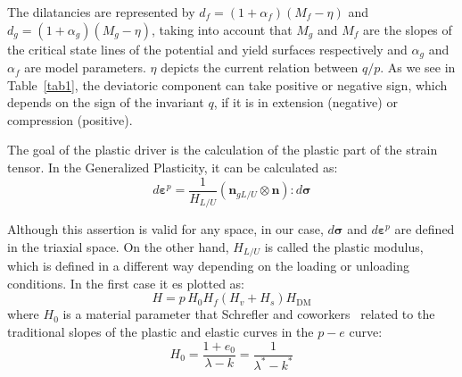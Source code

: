 \documentclass[preprint,12pt,a4paper]{elsarticle}
\begin{document}
The dilatancies are represented by $d_{f}=\left(1+\alpha_{f}\right)\left(M_{f}-\eta\right)$ and $d_{g}=\left(1+\alpha_{g}\right)\left(M_{g}-\eta\right)$, taking into account that $M_{g}$ and $M_{f}$ are the slopes of the critical state lines of the potential and yield surfaces respectively and $\alpha_{g}$ and $\alpha_{f}$ are model parameters. $\eta$ depicts the current relation between $q/p$. As we see in Table~\ref{tab1}, the deviatoric component can take positive or negative sign, which depends on the sign of the invariant $q$, if it is in extension (negative) or compression (positive).

The goal of the plastic driver is the calculation of the plastic part of the strain tensor. In the Generalized Plasticity, it can be calculated as:
\begin{equation}
d \boldsymbol{\varepsilon}^{p}=\frac{1}{H_{L / U}}\left(\mathbf{n}_{g L / U} \otimes \mathbf{n}\right) : d \boldsymbol{\sigma}
\end{equation}

Although this assertion is valid for any space, in our case, $d \boldsymbol{\sigma}$ and $d \boldsymbol{\varepsilon}^{p}$ are defined in the triaxial space. On the other hand, $H_{L / U}$ is called the plastic modulus, which is defined in a different way depending on the loading or unloading conditions. In the first case it es plotted as:
\begin{equation}
H=p\,H_{0}  H_{f}\left(H_{v}+H_{s}\right) H_{\mathrm{DM}}
\end{equation}\label{Eq_H}
where $H_0$ is a material parameter that Schrefler and coworkers~\cite{Santagiuliana2006} related to the traditional slopes of the plastic and elastic curves in the $p-e$ curve:
\begin{equation}
H_{0}=\frac{1+e_{0}}{\lambda-k}=\frac{1}{\lambda^*-k^*}
\end{equation}
\end{document}
